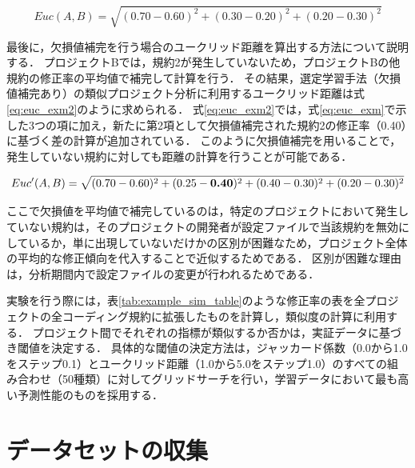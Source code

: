 \documentclass[11pt]{jreport}
\begin{document}
\begin{equation}
\label{eq:euc_exm}
Euc(A, B) = \sqrt{(0.70 - 0.60)^2 + (0.30 - 0.20)^2 + (0.20 - 0.30)^2}
\end{equation}

最後に，欠損値補完を行う場合のユークリッド距離を算出する方法について説明する．
プロジェクトBでは，規約2が発生していないため，プロジェクトBの他規約の修正率の平均値で補完して計算を行う．
その結果，選定学習手法（欠損値補完あり）の類似プロジェクト分析に利用するユークリッド距離は式\ref{eq:euc_exm2}のように求められる．
式\ref{eq:euc_exm2}では，式\ref{eq:euc_exm}で示した3つの項に加え，新たに第2項として欠損値補完された規約2の修正率（0.40）に基づく差の計算が追加されている．
このように欠損値補完を用いることで，発生していない規約に対しても距離の計算を行うことが可能である．

\begin{equation}
\label{eq:euc_exm2}
Euc'(A, B) = \sqrt{(0.70 - 0.60)^2 + (0.25 - \textbf{0.40})^2 + (0.40 - 0.30)^2 + (0.20 - 0.30)^2}
\vspace{10pt}
\end{equation}

ここで欠損値を平均値で補完しているのは，特定のプロジェクトにおいて発生していない規約は，そのプロジェクトの開発者が設定ファイルで当該規約を無効にしているか，単に出現していないだけかの区別が困難なため，プロジェクト全体の平均的な修正傾向を代入することで近似するためである．
区別が困難な理由は，分析期間内で設定ファイルの変更が行われるためである．




実験を行う際には，表\ref{tab:example_sim_table}のような修正率の表を全プロジェクトの全コーディング規約に拡張したものを計算し，類似度の計算に利用する．
プロジェクト間でそれぞれの指標が類似するか否かは，実証データに基づき閾値を決定する．
具体的な閾値の決定方法は，ジャッカード係数（0.0から1.0をステップ0.1）とユークリッド距離（1.0から5.0をステップ1.0）のすべての組み合わせ（50種類）に対してグリッドサーチを行い，学習データにおいて最も高い予測性能のものを採用する．



\section{データセットの収集}
\end{document}
